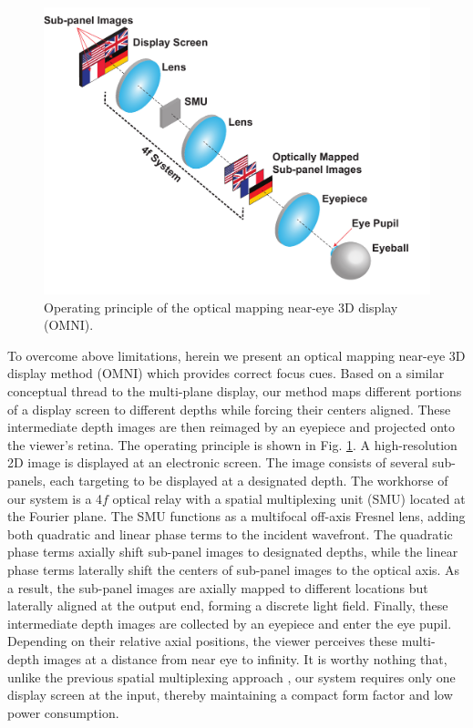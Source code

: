 \documentclass[9pt,twocolumn,twoside]{osajnl}
\begin{document}
\begin{figure}[tbp]
\centering
\includegraphics[width=\linewidth]{OMNIfig1}
\caption{Operating principle of the optical mapping near-eye 3D display (OMNI).}
\label{fig:1}
\end{figure}

To overcome above limitations, herein we present an optical mapping near-eye 3D display method (OMNI) which provides correct focus cues.  Based on a similar conceptual thread to the multi-plane display, our method maps different portions of a display screen to different depths while forcing their centers aligned. These intermediate depth images are then reimaged by an eyepiece and projected onto the viewer’s retina. The operating principle is shown in Fig. \ref{fig:1}.  A high-resolution 2D image is displayed at an electronic screen.  The image consists of several sub-panels, each targeting to be displayed at a designated depth. The workhorse of our system is a 4$f$ optical relay with a spatial multiplexing unit (SMU) located at the Fourier plane. The SMU functions as a multifocal off-axis Fresnel lens, adding both quadratic and linear phase terms to the incident wavefront. The quadratic phase terms axially shift sub-panel images to designated depths, while the linear phase terms laterally shift the centers of sub-panel images to the optical axis. As a result, the sub-panel images are axially mapped to different locations but laterally aligned at the output end, forming a discrete light field.  Finally, these intermediate depth images are collected by an eyepiece and enter the eye pupil. Depending on their relative axial positions, the viewer perceives these multi-depth images at a distance from near eye to infinity. It is worthy nothing that, unlike the previous spatial multiplexing approach \cite{hoffman2008vergence}, our system requires only one display screen at the input, thereby maintaining a compact form factor and low power consumption.
\end{document}
